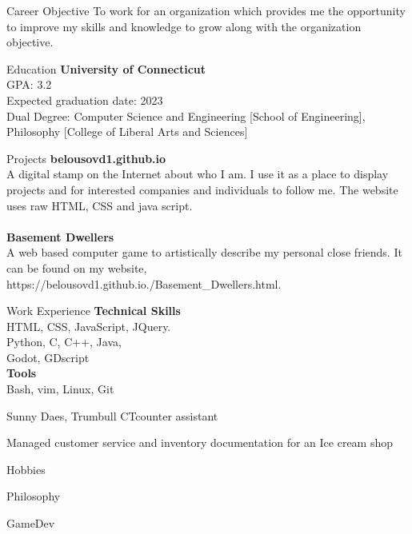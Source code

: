 \documentclass{resume}
\begin{document}
\begin{rSection}{Career Objective}
 To work for an organization which provides me the opportunity to improve my skills and knowledge to grow along with the organization objective.
\end{rSection}

\begin{rSection}{Education}
{\bf University of Connecticut} 
\\ GPA: 3.2
\\ Expected graduation date:   2023
\\ Dual Degree: Computer Science and Engineering [School of Engineering], Philosophy [College of Liberal Arts and Sciences]
\end{rSection}


\begin{rSection}{Projects}
{\bf belousovd1.github.io}
\\A digital stamp on the Internet about who I am. I use it as a place to display projects and for interested companies and individuals to follow me. The website uses raw HTML, CSS and java script.\\
\\{\bf Basement Dwellers}\\
A web based computer game to artistically describe my personal close friends. It can be found on my website, https://belousovd1.github.io./Basement\_Dwellers.html. 
\end{rSection}


\begin{rSection}{Work Experience}
{\bf Technical Skills}\\
HTML, CSS, JavaScript, JQuery. \\
Python, C, C++, Java,  \\ 
Godot, GDscript \\

{\bf Tools} \\
Bash, vim, Linux, Git \\

\begin{rSubsection}{Sunny Daes, Trumbull CT}{}{counter assistant}{}
\item Managed customer service and inventory documentation for an Ice cream shop
\end{rSubsection}
\end{rSection}

\begin{rSection}{Hobbies}
\item Philosophy
\item GameDev
\end{rSection}
\end{document}
